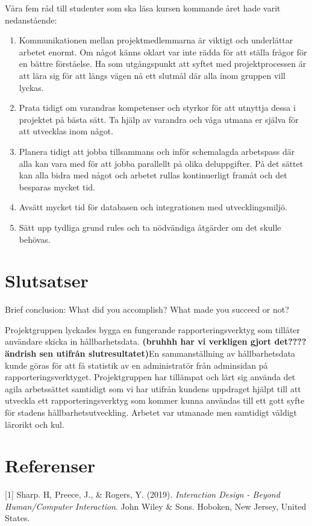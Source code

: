 \documentclass[12pt]{article}
\begin{document}
Våra fem råd till studenter som ska läsa kursen kommande året hade varit nedanstående:
\begin{enumerate}

\item  Kommunikationen mellan projektmedlemmarna är viktigt och underlättar arbetet enormt. Om något känns oklart var inte rädda för att ställa frågor för en bättre förståelse. Ha som utgångspunkt att syftet med projektprocessen är att lära sig för att längs vägen nå ett slutmål där alla inom gruppen vill lyckas.
\item Prata tidigt om varandras kompetenser och styrkor för att utnyttja dessa i projektet på bästa sätt. Ta hjälp av varandra och våga utmana er själva för att utvecklas inom något. 
\item  Planera tidigt att jobba tillsammans och inför schemalagda arbetspass där alla kan vara med för att jobba parallellt på olika deluppgifter. På det sättet kan alla bidra med något och arbetet rullas kontinuerligt framåt och det besparas mycket tid. 
\item  Avsätt mycket tid för databasen och integrationen med utvecklingsmiljö. 
\item  Sätt upp tydliga grund rules och ta nödvändiga åtgärder om det skulle behövas.        
\end{enumerate}

\section{Slutsatser}
Brief conclusion: What did you accomplish? What made you succeed or not? 

Projektgruppen lyckades bygga en fungerande rapporteringsverktyg som tillåter användare skicka in hållbarhetsdata.
\textbf{(bruhhh har vi verkligen gjort det???? ändrish sen utifrån slutresultatet)}En sammanställning av hållbarhetsdata kunde göras för att få statistik av en administratör från adminsidan på rapporteringsverktyget. Projektgruppen har tillämpat och lärt sig använda det agila arbetssättet samtidigt som vi har utifrån kundens uppdraget hjälpt till att utveckla ett  rapporteringsverktyg som kommer kunna användas till ett gott syfte för stadens hållbarhetsutveckling. Arbetet var utmanade men samtidigt väldigt lärorikt och kul. 

\section{Referenser}
[1] Sharp. H, Preece, J., \& Rogers, Y. (2019). \textit{Interaction Design - Beyond Human/Computer Interaction}. John Wiley \& Sons. Hoboken, New Jersey, United States. \\
\end{document}
